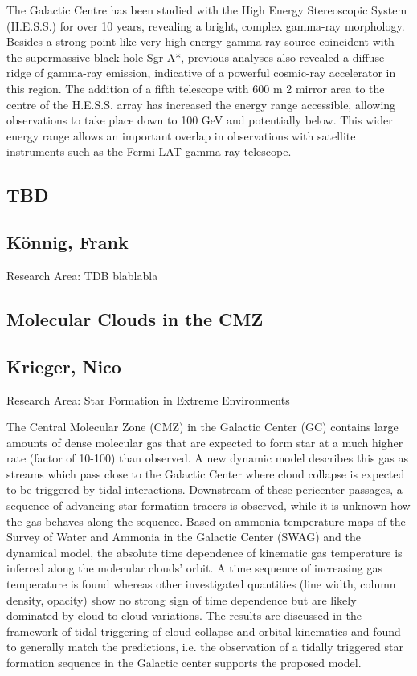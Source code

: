 \noindent The Galactic Centre has been studied with the High Energy Stereoscopic System (H.E.S.S.) for over 10 years, revealing a bright, complex gamma-ray morphology. Besides a strong point-like very-high-energy gamma-ray source coincident with the supermassive black hole Sgr A*, previous analyses also revealed a diffuse ridge of gamma-ray emission, indicative of a powerful cosmic-ray accelerator in this region. The addition of a fifth telescope with 600 m 2 mirror area to the centre of the H.E.S.S. array has increased the energy range accessible, allowing observations to take place down to 100 GeV and potentially below. This wider energy range allows an important overlap in observations with satellite instruments such as the Fermi-LAT gamma-ray telescope.
\newpage
\subsection*{\centering \large TBD}
\subsection*{\centering \large K\"onnig, Frank}
Research Area: TDB \newline
\noindent blablabla


\subsection*{\centering \large Molecular Clouds in the CMZ}
\subsection*{\centering \normalsize Krieger, Nico}
Research Area: Star Formation in Extreme Environments\newline

\noindent The Central Molecular Zone (CMZ) in the Galactic Center (GC) contains large amounts of dense molecular gas that are expected to form star at a much higher rate (factor of 10-100) than observed. A new dynamic model describes this gas as streams which pass close to the Galactic Center where cloud collapse is expected to be triggered by tidal interactions. Downstream of these pericenter passages, a sequence of advancing star formation tracers is observed, while it is unknown how the gas behaves along the sequence.\newline
Based on ammonia temperature maps of the Survey of Water and Ammonia in the Galactic Center (SWAG) and the dynamical model, the absolute time dependence of kinematic gas temperature is inferred along the molecular clouds’ orbit. A time sequence of increasing gas temperature is found whereas other investigated quantities (line width, column density, opacity) show no strong sign of time dependence but are likely dominated by cloud-to-cloud variations. The results are discussed in the framework of tidal triggering of cloud collapse and orbital kinematics and found to generally match the predictions, i.e. the observation of a tidally triggered star formation sequence in the Galactic center supports the proposed model.
\newpage
